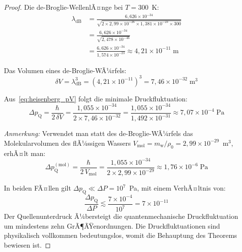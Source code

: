 ﻿\documentclass[12pt,a4paper]{report}
\begin{document}
\begin{proof}
	Die de-Broglie-WellenlÃ¤nge bei $T = 300$~K:
	\begin{align*}
		\lambda_\mathrm{dB} &= \frac{6{,}626\times10^{-34}}{\sqrt{2\times2{,}99\times10^{-26}\times1{,}381\times10^{-23}\times300}} \\
		&= \frac{6{,}626\times10^{-34}}{\sqrt{2{,}478\times10^{-46}}} \\
		&= \frac{6{,}626\times10^{-34}}{1{,}574\times10^{-23}}
		\approx 4{,}21\times10^{-11}\;\text{m}
		\label{eq:lambda_db_numerisch}
	\end{align*}
	
	Das Volumen eines de-Broglie-WÃ¼rfels:
	\begin{equation}
		\delta V = \lambda_\mathrm{dB}^3 = (4{,}21\times10^{-11})^3 = 7{,}46\times10^{-32}\;\text{m}^3
		\label{eq:dV_numerisch}
	\end{equation}
	
	Aus~\eqref{eq:heisenberg_pV} folgt die minimale Druckfluktuation:
	\begin{equation}
		\Delta p_\mathrm{Q} = \frac{\hbar}{2\,\delta V} = \frac{1{,}055\times10^{-34}}{2\times7{,}46\times10^{-32}} = \frac{1{,}055\times10^{-34}}{1{,}492\times10^{-31}} \approx 7{,}07\times10^{-4}\;\text{Pa}
		\label{eq:delta_p_ausfuehrlich}
	\end{equation}
	
	\textit{Anmerkung:} Verwendet man statt des de-Broglie-WÃ¼rfels das Molekularvolumen des flÃ¼ssigen Wassers $V_\mathrm{mol} = m_\mathrm{w}/\rho_0 = 2{,}99\times10^{-29}$~m$^3$, erhÃ¤lt man:
	\begin{equation}
		\Delta p_\mathrm{Q}^\mathrm{(mol)} = \frac{\hbar}{2\,V_\mathrm{mol}} = \frac{1{,}055\times10^{-34}}{2\times2{,}99\times10^{-29}} \approx 1{,}76\times10^{-6}\;\text{Pa}
		\label{eq:delta_p_mol}
	\end{equation}
	
	In beiden FÃ¤llen gilt $\Delta p_\mathrm{Q} \ll \Delta P = 10^7$~Pa, mit einem VerhÃ¤ltnis von:
	\begin{equation}
		\frac{\Delta p_\mathrm{Q}}{\Delta P} \lesssim \frac{7\times10^{-4}}{10^7} = 7\times10^{-11}
		\label{eq:verhaeltnis_fluktuation}
	\end{equation}
	Der Quellenunterdruck Ã¼bersteigt die quantenmechanische Druckfluktuation um mindestens zehn GrÃ¶ÃŸenordnungen. Die Druckfluktuationen sind physikalisch vollkommen bedeutungslos, womit die Behauptung des Theorems bewiesen ist.
\end{proof}
\end{document}
